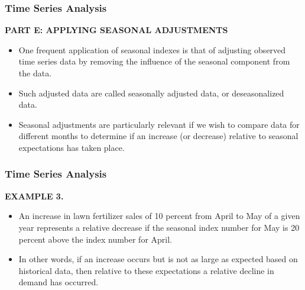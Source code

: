 
\begin{frame}
\frametitle{Time Series Analysis}
\textbf{PART E: APPLYING SEASONAL ADJUSTMENTS}
\begin{itemize}

\item One frequent application of seasonal indexes is that of adjusting observed time series data by removing the
influence of the seasonal component from the data. 
\item Such adjusted data are called seasonally adjusted data, or
deseasonalized data. 
\item Seasonal adjustments are particularly relevant if we wish to compare data for different
months to determine if an increase (or decrease) relative to seasonal expectations has taken place.
\end{itemize}
\end{frame}
\begin{frame}
\frametitle{Time Series Analysis}
\textbf{EXAMPLE 3. }
\begin{itemize}
\item An increase in lawn fertilizer sales of 10 percent from April to May of a given year represents a relative
decrease if the seasonal index number for May is 20 percent above the index number for April. 
\item In other words, if an increase
occurs but is not as large as expected based on historical data, then relative to these expectations a relative decline in demand
has occurred.
\end{itemize}
\end{frame}

